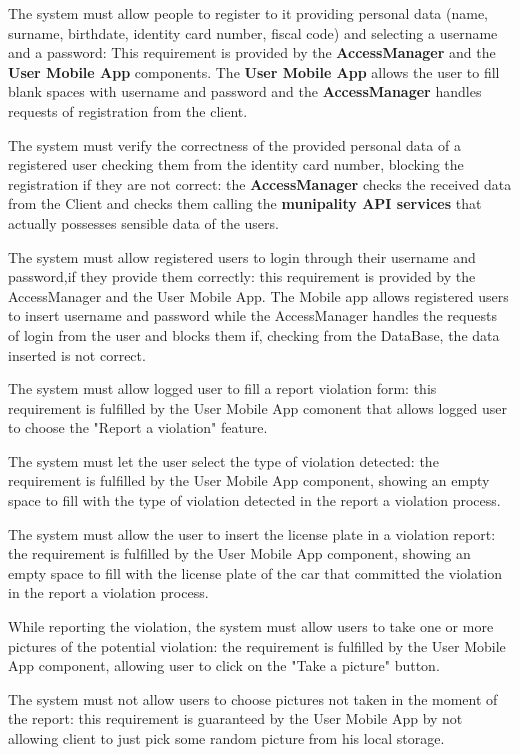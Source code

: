 \documentclass[a4paper]{report}
\begin{document}
\begin{enumerate}[start=1,label={[R\arabic*]}]
\item The system must allow people to register to it providing personal data (name, surname, birthdate, identity card number, fiscal code) and selecting a username and a password: This requirement is provided by the \textbf{AccessManager} and the \textbf{User Mobile App} components. The \textbf{User Mobile App} allows the user to fill blank spaces with username and password and the \textbf{AccessManager} handles requests of registration from the client.
\item The system must verify the correctness of the provided personal data of a registered user checking them from the identity card number, blocking the registration if they are not correct: the \textbf{AccessManager} checks the received data from the Client and checks them calling the \textbf{munipality API services} that actually possesses sensible data of the users. 
\item The system must allow registered users to login through their username and password,if they provide them correctly: this requirement is provided by the AccessManager and the User Mobile App. The Mobile app allows registered users to insert username and password while the AccessManager handles the requests of login from the user and blocks them  if, checking from the DataBase, the data inserted is not correct. 
\item The system must allow logged user to fill a report violation form: this requirement is fulfilled by the User Mobile App comonent that allows logged user to choose the "Report a violation" feature.
\item The system must let the user select the type of violation detected: the requirement is fulfilled by the User Mobile App component, showing an empty space to fill with the type of violation detected in the report a violation process.
\item The system must allow the user to insert the license plate in a violation report:  the requirement is fulfilled by the User Mobile App component, showing an empty space to fill with the license plate of the car that committed the violation in the report a violation process.
\item While reporting the violation, the system must allow users to take one or more pictures of the potential violation: the requirement is fulfilled by the User Mobile App component, allowing user to click on the "Take a picture" button.
\item The system must not allow users to choose pictures not taken in the moment of the report: this requirement is guaranteed by the User Mobile App by not allowing client to just pick some random picture from his local storage.

\end{enumerate}
\end{document}
